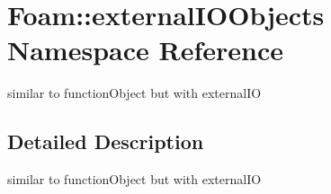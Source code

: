 \hypertarget{namespaceFoam_1_1externalIOObjects}{}\section{Foam\+:\+:external\+I\+O\+Objects Namespace Reference}
\label{namespaceFoam_1_1externalIOObjects}


similar to function\+Object but with external\+IO  




\subsection{Detailed Description}
similar to function\+Object but with external\+IO 

\label{_Description}%
 
